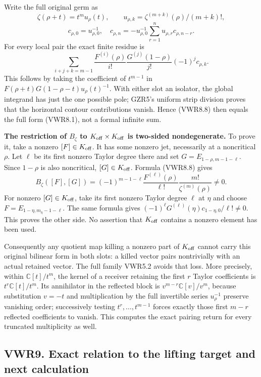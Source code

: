 Write the full original germ as \[
\zeta(\rho+t)=t^mu_\rho(t),\qquad
u_{\rho,k}=\zeta^{(m+k)}(\rho)/(m+k)!,
\] \[
c_{\rho,0}=u_{\rho,0}^{-1},\quad
c_{\rho,n}=-u_{\rho,0}^{-1}\sum_{r=1}^nu_{\rho,r}c_{\rho,n-r}.
\tag{VWR8.7}
\] For every local pair the exact finite residue is \[
\sum_{i+j+k=m-1}\frac{F^{(i)}(\rho)}{i!}
 \frac{G^{(j)}(1-\rho)}{j!}(-1)^jc_{\rho,k}.
\tag{VWR8.8}
\] This follows by taking the coefficient of \(t^{m-1}\) in
\(F(\rho+t)G(1-\rho-t)u_\rho(t)^{-1}\). With either slot an isolator,
the global integrand has just the one possible pole; GZR5's uniform
strip division proves that the horizontal contour contributions vanish.
Hence (VWR8.8) then equals the full form (VWR8.1), not a formal infinite
sum.

\textbf{The restriction of \(B_\zeta\) to
\(K_{\rm off}\times K_{\rm off}\) is two-sided nondegenerate.} To prove
it, take a nonzero \([F]\in K_{\rm off}\). It has some nonzero jet,
necessarily at a noncritical \(\rho\). Let \(\ell\) be its first nonzero
Taylor degree there and set \(G=E_{1-\rho,m-1-\ell}\). Since \(1-\rho\)
is also noncritical, \([G]\in K_{\rm off}\). Formula (VWR8.8) gives \[
B_\zeta([F],[G])=(-1)^{m-1-\ell}
\frac{F^{(\ell)}(\rho)}{\ell!}\frac{m!}{\zeta^{(m)}(\rho)}\ne0.
\tag{VWR8.9}
\] For nonzero \([G]\in K_{\rm off}\), take its first nonzero Taylor
degree \(\ell\) at \(\eta\) and choose \(F=E_{1-\eta,m_\eta-1-\ell}\).
The same formula gives
\((-1)^\ell G^{(\ell)}(\eta)c_{1-\eta,0}/\ell!\ne0\). This proves the
other side. No assertion that \(K_{\rm off}\) contains a nonzero element
has been used.

Consequently any quotient map killing a nonzero part of \(K_{\rm off}\)
cannot carry this original bilinear form in both slots: a killed vector
pairs nontrivially with an actual retained vector. The full family
VWR5.2 avoids that loss. More precisely, within \(\mathbb C[t]/t^m\),
the kernel of a receiver retaining the first \(r\) Taylor coefficients
is \(t^r\mathbb C[t]/t^m\). Its annihilator in the reflected block is
\(v^{m-r}\mathbb C[v]/v^m\), because substitution \(v=-t\) and
multiplication by the full invertible series \(u_\rho^{-1}\) preserve
vanishing order; successively testing \(t^r,\ldots,t^{m-1}\) forces
exactly those first \(m-r\) reflected coefficients to vanish. This
computes the exact pairing return for every truncated multiplicity as
well.

\subsection{VWR9. Exact relation to the lifting target and next
calculation}\label{vwr9.-exact-relation-to-the-lifting-target-and-next-calculation}

